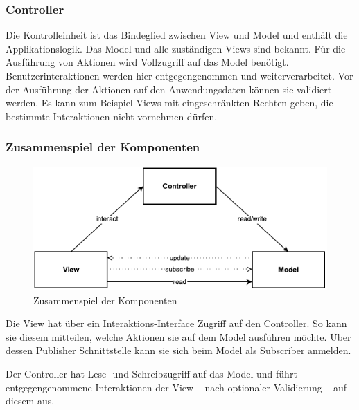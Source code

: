 \documentclass[
							a4paper, 
							11pt, 
							openany, 
							liststotoc,
							parskip=half, 
   							headings=normal
						]{scrreprt}
\begin{document}
{%
\subsubsection{Controller} \label{ssse:grundlagen_mvc_controller}
Die Kontrolleinheit ist das Bindeglied zwischen View und Model und enthält die Applikationslogik. Das Model und alle zuständigen Views sind bekannt. Für die Ausführung von Aktionen wird Vollzugriff auf das Model benötigt.\newline
Benutzerinteraktionen werden hier entgegengenommen und weiterverarbeitet.
Vor der Ausführung der Aktionen auf den Anwendungsdaten können sie validiert werden. Es kann zum Beispiel Views mit eingeschränkten Rechten geben, die bestimmte Interaktionen nicht vornehmen dürfen.\cite{wiki:mvc}

\subsubsection{Zusammenspiel der Komponenten} \label{ssse:grundlagen_mvc_zusammenspiel}
\begin{figure}[H]
\begin{center}
    \includegraphics[width=1.0\textwidth]{./pictures/standard_mvc.pdf}
	\caption[Grundlagen -- Zusammenspiel der \acs{mvc} Komponenten]{Zusammenspiel der Komponenten} \label{fig:mvc_zusammenspiel}
\end{center}
\end{figure}

Die View hat über ein Interaktions-Interface Zugriff auf den Controller. So kann sie diesem mitteilen, welche Aktionen sie auf dem Model ausführen möchte. Über dessen Publisher Schnittstelle kann sie sich beim Model als Subscriber anmelden. 

Der Controller hat Lese- und Schreibzugriff auf das Model und führt entgegengenommene Interaktionen der View -- nach optionaler Validierung -- auf diesem aus.

}
\end{document}
